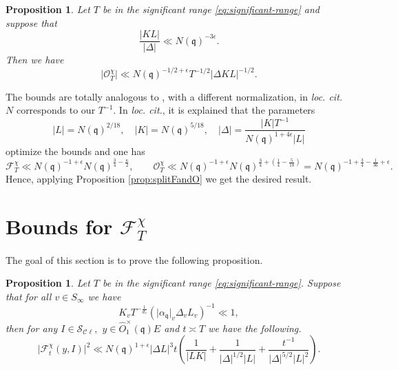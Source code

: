 \documentclass[a4paper,11pt]{amsart}
\newtheorem{proposition}[theorem]{Proposition}
\theoremstyle{definition}
\newcommand{\cl}{\mathcal{C}\ell}
\begin{document}
\begin{proposition}\label{prop:boundO}
     Let $T$ be in the significant range \eqref{eq:significant-range} and suppose that 
     \[ \frac{\vert{KL}\vert}{\vert \Delta \vert} \ll N(\mathfrak{q})^{-3\epsilon}.\] Then we have
     \[\vert{\mathcal{O}_T^{\chi}}\vert \ll N(\mathfrak{q})^{-1/2+\epsilon}T^{-1/2}\vert{\Delta KL}\vert^{-1/2}.\]
\end{proposition}



The bounds are totally analogous to \cite[Proposition 1, Proposition 2]{nelsonholowinsky}, with a different normalization, in \emph{loc. cit.} $N$ corresponds to our $T^{-1}$. In \emph{loc. cit.}, it is explained that the parameters $$\vert{L}\vert = N(\mathfrak{q})^{2/18},\quad \vert K\vert = N(\mathfrak{q})^{5/18},\quad \vert \Delta \vert = \frac{\vert K \vert T^{-1}}{N(\mathfrak{q})^{1+4\epsilon}\vert L \vert }$$ optimize the bounds and one has
    \begin{equation}\label{eq:finalequation}\mathcal{F}_T^{\chi} \ll N(\mathfrak{q})^{-1+\epsilon} N(\mathfrak{q})^{\frac{3}{4}-\frac{\kappa}{2}},\qquad \mathcal{O}_T^{\chi} \ll N(\mathfrak{q})^{-1+\epsilon}N(\mathfrak{q})^{\frac{3}{4}+(\frac{1}{4}-\frac{5}{18})} = N(\mathfrak{q})^{-1+\frac{3}{4}-\frac{1}{36}+\epsilon}. \end{equation}
    Hence, applying Proposition \ref{prop:splitFandO} we get the desired result. 
    











\section{Bounds for $\mathcal{F}^{\chi}_T$}\label{sec:Bounds for FT}

The goal of this section is to prove the following proposition.

\begin{proposition}\label{prop:boundf} Let $T$ be in the significant range \eqref{eq:significant-range}.
Suppose that for all $v\in S_{\infty}$ we have \begin{equation}\label{eq:choicedelta_v2}K_vT^{-\frac{1}{d_v}}(\vert \alpha_\mathfrak{q}\vert_v\Delta_vL_v)^{-1} \ll 1,\end{equation}
then for any $I\in \mathcal{S}_{\cl},$ $y \in \widehat{O}_1^{\times}(\mathfrak{q})E$ and $t\asymp T$ we have the following. 
\[\vert{\mathcal{F}_t^\chi(y,I)}\vert^2 \ll N(\mathfrak{q})^{1+\epsilon}\vert{\Delta L}\vert^3t\left(\frac{1}{\vert{LK}\vert} + \frac{1}{\vert\Delta\vert^{1/2} \vert L\vert}+\frac{t^{-1}}{\vert\Delta\vert^{5/2}\vert L\vert ^2}\right).  \]
\end{proposition}
\end{document}
